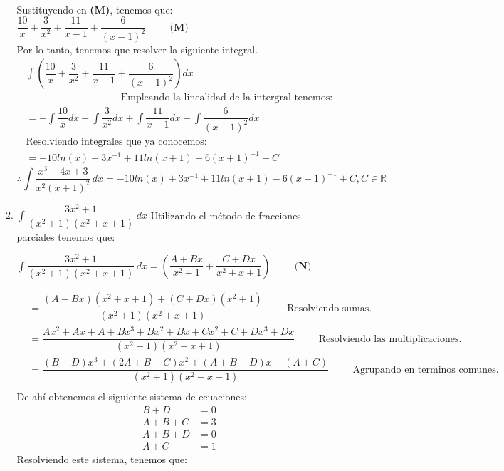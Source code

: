 \documentclass[letterpaper]{article}
\newcommand{\R}{\mathds{R}}
\renewcommand{\*}{\cdot}
\theoremstyle{definition}
\begin{document}
\begin{enumerate}
\begin{enumerate}
\begin{align*}
\end{align*}
Sustituyendo en \textbf{(M)}, tenemos que: $\dfrac{10}{x}+\dfrac{3}{x^2}+\dfrac{11}{x-1}+\dfrac{6}{(x-1)^2}\hspace{1cm}{\textbf{(M)}}$\\
Por lo tanto, tenemos que resolver la siguiente integral.
\begin{align*}
\int(\dfrac{10}{x}+\dfrac{3}{x^2}+\dfrac{11}{x-1}+\dfrac{6}{(x-1)^2}) dx\\
\hspace{4cm}\text{Empleando la linealidad de la intergral tenemos:}\\
= -\int \dfrac{10}{x}dx +\int \dfrac{3}{x^2}dx +\int \dfrac{11}{x-1}dx +\int \dfrac{6}{(x-1)^2}dx\\
\text{Resolviendo integrales que ya conocemos:}\\
=-10ln(x) +3x^{-1}+11ln(x+1)-6(x+1)^{-1}+C
\end{align*}
\[ \therefore \int \dfrac{x^3 - 4x + 3}{x^2(x+1)^2} \, dx= -10ln(x) +3x^{-1}+11ln(x+1)-6(x+1)^{-1}+C, C\in \R \] 
\item$\displaystyle \int  \dfrac{3x^2 + 1}{(x^2 +1 ) (x^2 + x +1)} \, dx$
Utilizando el método de fracciones parciales tenemos que:\\
\begin{center}
	$\int  \dfrac{3x^2 + 1}{(x^2 +1 ) (x^2 + x +1)} \, dx= (\dfrac{A+Bx}{x^2+1}+\dfrac{C+Dx}{x^2+x+1})\hspace{1cm}{\textbf{(N)}}$
\end{center}
\begin{align*}
&=\dfrac{(A+Bx)(x^2+x+1)+(C+Dx)(x^2+1)}{(x^2+1)(x^2+x+1)}\hspace{1cm}\text{Resolviendo sumas.}\\
&=\dfrac{Ax^2+Ax+A+Bx^3+Bx^2+Bx+Cx^2+C+Dx^3+Dx}{(x^2+1)(x^2+x+1)}\hspace{1cm}\text{Resolviendo las multiplicaciones.}\\
&=\dfrac{(B+D)x^3+(2A+B+C)x^2+(A+B+D)x+(A+C)}{(x^2+1)(x^2+x+1)}\hspace{1cm}\text{Agrupando en terminos comunes.}\\
\end{align*}
De ahí obtenemos el siguiente sistema de ecuaciones:
\begin{align*}
B+D &= 0\\
A+B+C &= 3\\
A+B+D &= 0\\
A+C&=1
\end{align*}
Resolviendo este sistema, tenemos que:

\end{enumerate}
\end{enumerate}
\end{document}
